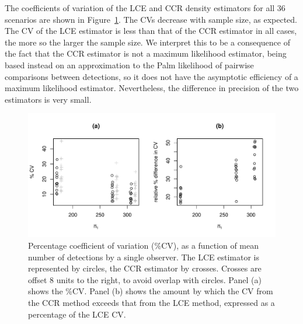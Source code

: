 \documentclass[useAMS, usenatbib, referee]{biom}\usepackage[]{graphicx}\usepackage[]{color}
\makeatletter
\def\maxwidth{ %
  \ifdim\Gin@nat@width>\linewidth
    \linewidth
  \else
    \Gin@nat@width
  \fi
}
\newenvironment{knitrout}{}{} %
\makeatother
\begin{document}
The coefficients of variation of the LCE and CCR density estimators for all 36 scenarios are shown in Figure~\ref{fig:fig_mlepalm_cv_bcs}. The CVs decrease with sample size, as expected. The CV of the LCE estimator is less than that of the CCR estimator in all cases, the more so the larger the sample size. We interpret this to be a consequence of the fact that the CCR estimator is not a maximum likelihood estimator, being based instead on an approximation to the Palm likelihood of pairwise comparisons between detections, so it does not have the asymptotic efficiency of a maximum likelihood estimator. Nevertheless, the difference in precision of the two estimators is very small.



\begin{knitrout}
\color{fgcolor}\begin{figure}

{\centering \includegraphics[width=\maxwidth]{figure/fig_mlepalm_cv_bcs-1} 

}

\caption[Percentage coefficient of variation (\%CV), as a function of mean number of detections by a single observer]{Percentage coefficient of variation (\%CV), as a function of mean number of detections by a single observer. The LCE estimator is represented by circles, the CCR estimator by crosses. Crosses are offset 8 units to the right, to avoid overlap with circles. Panel (a) shows the \%CV. Panel (b) shows the amount by which the CV from the CCR method exceeds that from the LCE method, expressed as a percentage of the LCE CV.}\label{fig:fig_mlepalm_cv_bcs}
\end{figure}


\end{knitrout}
\end{document}
